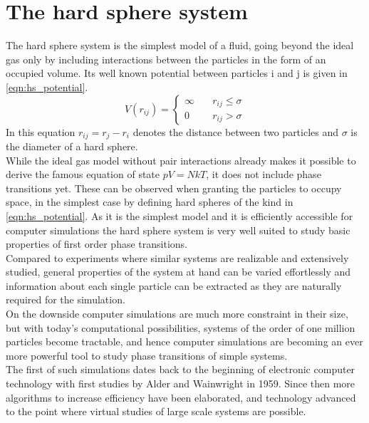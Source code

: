 
\label{chp:theory}

\section{The hard sphere system}
\label{sec:HS_system}
The hard sphere system is the simplest model of a fluid, going beyond the ideal gas only by including interactions between the particles in the form of an occupied volume. Its well known potential between particles i and j is given in \autoref{eqn:hs_potential}.
\begin{equation}
\label{eqn:hs_potential}
V(r_{ij})=%
\begin{cases}
\infty \quad & r_{ij} \le \sigma \\
0 \quad & r_{ij} > \sigma
\end{cases}
\end{equation}
In this equation $r_{ij} = r_j - r_i$ denotes the distance between two particles and $\sigma$ is the diameter of a hard sphere.\\

While the ideal gas model without pair interactions already makes it possible to derive the famous equation of state $pV=NkT$, it does not include phase transitions yet. These can be observed when granting the particles to occupy space, in the simplest case by defining hard spheres of the kind in \autoref{eqn:hs_potential}. As it is the simplest model and it is efficiently accessible for computer simulations the hard sphere system is very well suited to study basic properties of first order phase transitions.\\ 

Compared to experiments where similar systems are realizable and extensively studied, general properties of the system at hand can be varied effortlessly and information about each single particle can be extracted as they are naturally required for the simulation.\\

On the downside computer simulations are much more constraint in their size, but with today's computational possibilities, systems of the order of one million particles become tractable, and hence computer simulations are becoming an ever more powerful tool to study phase transitions of simple systems.\\

The first of such simulations dates back to the beginning of electronic computer technology with first studies by Alder and Wainwright in 1959\cite{Alders59}. Since then more algorithms to increase efficiency have been elaborated, and technology advanced to the point where virtual studies of large scale systems are possible.

